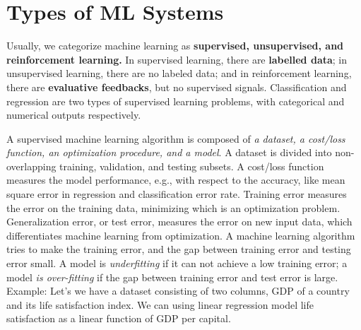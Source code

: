 \documentclass[openany]{book}
\begin{document}








\section{Types of ML Systems}

Usually, we categorize machine learning as \textbf{supervised, unsupervised, and reinforcement learning.} In supervised learning, there are \textbf{labelled data}; in unsupervised learning, there are no labeled data; and in reinforcement learning, there are \textbf{evaluative feedbacks}, but no supervised signals.  Classification and regression are two types of supervised learning problems, with categorical and numerical outputs respectively.

A supervised machine learning algorithm is composed of \textit{a dataset, a cost/loss function, an optimization procedure, and a model}.  A dataset is divided into non-overlapping training, validation,  and testing subsets.  A cost/loss function measures the model performance,  e.g.,  with respect to the accuracy, like mean square error in regression and classification error rate. Training error measures the error on the training data, minimizing which is an optimization problem.  Generalization error, or test error, measures the error on new input data, which differentiates machine learning from optimization.  A machine learning algorithm tries to make the training error, and the gap between training error and testing error small.  A model is \textit{underfitting} if it can not achieve a low training error; a model \textit{is over-fitting} if the gap between training error and test error is large. \\

Example: Let's we have a dataset consisting of two columns, GDP of a country and its life satisfaction index. We can using linear regression model life satisfaction as a linear function of GDP per capital. 
\end{document}
